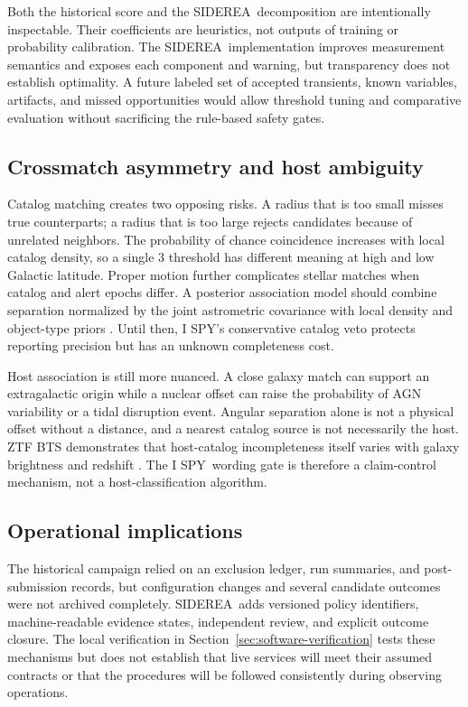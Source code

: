 \documentclass[11pt]{article}
\newcommand{\legacycampaign}{I SPY}
\newcommand{\siderea}{SIDEREA}
\begin{document}
Both the historical score and the \siderea\ decomposition are intentionally inspectable. Their coefficients are heuristics, not outputs of training or probability calibration. The \siderea\ implementation improves measurement semantics and exposes each component and warning, but transparency does not establish optimality. A future labeled set of accepted transients, known variables, artifacts, and missed opportunities would allow threshold tuning and comparative evaluation without sacrificing the rule-based safety gates.

\subsection{Crossmatch asymmetry and host ambiguity}

Catalog matching creates two opposing risks. A radius that is too small misses true counterparts; a radius that is too large rejects candidates because of unrelated neighbors. The probability of chance coincidence increases with local catalog density, so a single \SI{3}{\arcsec} threshold has different meaning at high and low Galactic latitude. Proper motion further complicates stellar matches when catalog and alert epochs differ. A posterior association model should combine separation normalized by the joint astrometric covariance with local density and object-type priors \citep{budavari2008}. Until then, \legacycampaign's conservative catalog veto protects reporting precision but has an unknown completeness cost.

Host association is still more nuanced. A close galaxy match can support an extragalactic origin while a nuclear offset can raise the probability of AGN variability or a tidal disruption event. Angular separation alone is not a physical offset without a distance, and a nearest catalog source is not necessarily the host. ZTF BTS demonstrates that host-catalog incompleteness itself varies with galaxy brightness and redshift \citep{fremling2020}. The \legacycampaign\ wording gate is therefore a claim-control mechanism, not a host-classification algorithm.

\subsection{Operational implications}

The historical campaign relied on an exclusion ledger, run summaries, and post-submission records, but configuration changes and several candidate outcomes were not archived completely. \siderea\ adds versioned policy identifiers, machine-readable evidence states, independent review, and explicit outcome closure. The local verification in Section~\ref{sec:software-verification} tests these mechanisms but does not establish that live services will meet their assumed contracts or that the procedures will be followed consistently during observing operations.
\end{document}
